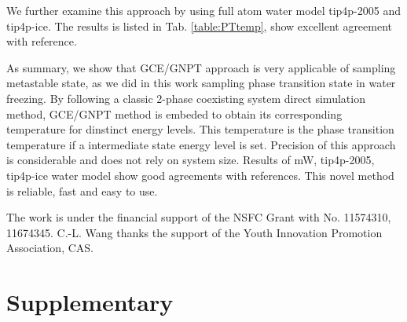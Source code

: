 \documentclass[aps,prl,twocolumn,superscriptaddress]{revtex4-1}
\begin{document}
We further examine this approach by using full atom water model tip4p-2005 and tip4p-ice. The results is listed in Tab. \ref{table:PTtemp}, show excellent agreement with reference\cite{Abascal2005}.
 
 
 

As summary, we show that GCE/GNPT approach is very applicable of sampling metastable state, as we did in this work sampling phase transition state in water freezing. By following a classic 2-phase coexisting system direct simulation method, GCE/GNPT method is embeded to obtain its corresponding temperature for dinstinct energy levels. This temperature is the phase transition temperature if a intermediate state energy level is set. Precision of this approach is considerable and does not rely on system size. Results of mW, tip4p-2005, tip4p-ice water model show good agreements with references. This novel method is reliable, fast and easy to use.
    
The work is under the financial support of the NSFC Grant with No. 11574310, 11674345. C.-L. Wang thanks the support of the Youth Innovation Promotion Association, CAS. 

\section{Supplementary}
\end{document}
